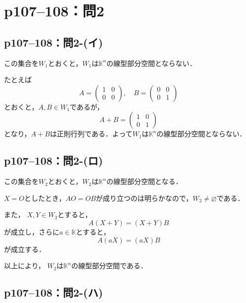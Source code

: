 \section*{p107--108：問2}


\subsection*{p107--108：問2-(イ)}

\begin{tanswer}この集合を$W_1$とおくと，$W_1$は$\mathbb{K}^n$の線型部分空間とならない．

  たとえば
  \[
    A = \begin{pmatrix} 1 & 0 \\ 0 & 0 \end{pmatrix},\quad B = \begin{pmatrix} 0 & 0 \\ 0 & 1 \end{pmatrix}
  \]
  とおくと，$ A , B \in W_1$であるが，
  \[
    A + B = \begin{pmatrix} 1 & 0 \\ 0 & 1 \end{pmatrix}
  \]
  となり，$A+B$は正則行列である．よって$W_1$は$\mathbb{K}^n$の線型部分空間とならない．
\end{tanswer}


\subsection*{p107--108：問2-(ロ)}

\begin{tanswer}
  この集合を$W_2$とおくと，$W_2$は$\mathbb{K}^n$の線型部分空間となる．

  $X =O$としたとき，$A O = OB$が成り立つのは明らかなので，$ W_2 \ne \varnothing$である．

  また， $X,Y \in W_2$とすると，
  \[
    A(X+Y)=(X+Y)B
  \]
  が成立し，さらに$ a\in \mathbb{K}$とすると，
  \[
    A(aX)=(aX)B
  \]
  が成立する．

  以上により， $W_2$は$\mathbb{K}^n$の線型部分空間である．
\end{tanswer}

\subsection*{p107--108：問2-(ハ)}

